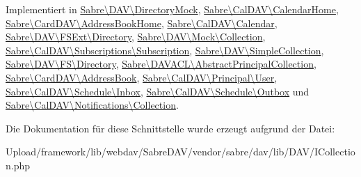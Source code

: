 Implementiert in \mbox{\hyperlink{class_sabre_1_1_d_a_v_1_1_directory_mock_a82552ec5014fe8fa6c33521bb5c17cef}{Sabre\textbackslash{}\+D\+A\+V\textbackslash{}\+Directory\+Mock}}, \mbox{\hyperlink{class_sabre_1_1_cal_d_a_v_1_1_calendar_home_aa97108e2047c34a8d17ee6bbac1f4e67}{Sabre\textbackslash{}\+Cal\+D\+A\+V\textbackslash{}\+Calendar\+Home}}, \mbox{\hyperlink{class_sabre_1_1_card_d_a_v_1_1_address_book_home_a6df725f024e566d1d94f5fc312c2c17d}{Sabre\textbackslash{}\+Card\+D\+A\+V\textbackslash{}\+Address\+Book\+Home}}, \mbox{\hyperlink{class_sabre_1_1_cal_d_a_v_1_1_calendar_a438e79532992b4da02ed17df296a9346}{Sabre\textbackslash{}\+Cal\+D\+A\+V\textbackslash{}\+Calendar}}, \mbox{\hyperlink{class_sabre_1_1_d_a_v_1_1_f_s_ext_1_1_directory_a1e4053591ca60a6abd189f88b6ed1bba}{Sabre\textbackslash{}\+D\+A\+V\textbackslash{}\+F\+S\+Ext\textbackslash{}\+Directory}}, \mbox{\hyperlink{class_sabre_1_1_d_a_v_1_1_mock_1_1_collection_a3814f1e53b147e13ebdddc6324639a80}{Sabre\textbackslash{}\+D\+A\+V\textbackslash{}\+Mock\textbackslash{}\+Collection}}, \mbox{\hyperlink{class_sabre_1_1_cal_d_a_v_1_1_subscriptions_1_1_subscription_a167dfe0d1f2dd478b1e3e80da4240d98}{Sabre\textbackslash{}\+Cal\+D\+A\+V\textbackslash{}\+Subscriptions\textbackslash{}\+Subscription}}, \mbox{\hyperlink{class_sabre_1_1_d_a_v_1_1_simple_collection_abd14f5c14daf0ab6cb480c9894b25f16}{Sabre\textbackslash{}\+D\+A\+V\textbackslash{}\+Simple\+Collection}}, \mbox{\hyperlink{class_sabre_1_1_d_a_v_1_1_f_s_1_1_directory_ab955171be88f9c130fd8d71f5d271aab}{Sabre\textbackslash{}\+D\+A\+V\textbackslash{}\+F\+S\textbackslash{}\+Directory}}, \mbox{\hyperlink{class_sabre_1_1_d_a_v_a_c_l_1_1_abstract_principal_collection_abf3123b838a191b0a60d2324ba3e95dc}{Sabre\textbackslash{}\+D\+A\+V\+A\+C\+L\textbackslash{}\+Abstract\+Principal\+Collection}}, \mbox{\hyperlink{class_sabre_1_1_card_d_a_v_1_1_address_book_a0ce5bf311d7c56481966ddf34d2b2563}{Sabre\textbackslash{}\+Card\+D\+A\+V\textbackslash{}\+Address\+Book}}, \mbox{\hyperlink{class_sabre_1_1_cal_d_a_v_1_1_principal_1_1_user_a98c22dc6958f352eadf92c960bd3bf19}{Sabre\textbackslash{}\+Cal\+D\+A\+V\textbackslash{}\+Principal\textbackslash{}\+User}}, \mbox{\hyperlink{class_sabre_1_1_cal_d_a_v_1_1_schedule_1_1_inbox_afd7af5894f052f0a2eb86455065fe495}{Sabre\textbackslash{}\+Cal\+D\+A\+V\textbackslash{}\+Schedule\textbackslash{}\+Inbox}}, \mbox{\hyperlink{class_sabre_1_1_cal_d_a_v_1_1_schedule_1_1_outbox_a08366beb598d4e73e772562cd342cba9}{Sabre\textbackslash{}\+Cal\+D\+A\+V\textbackslash{}\+Schedule\textbackslash{}\+Outbox}} und \mbox{\hyperlink{class_sabre_1_1_cal_d_a_v_1_1_notifications_1_1_collection_ad32780b546f2afcf90bd761741735831}{Sabre\textbackslash{}\+Cal\+D\+A\+V\textbackslash{}\+Notifications\textbackslash{}\+Collection}}.



Die Dokumentation für diese Schnittstelle wurde erzeugt aufgrund der Datei\+:\begin{DoxyCompactItemize}
\item 
Upload/framework/lib/webdav/\+Sabre\+D\+A\+V/vendor/sabre/dav/lib/\+D\+A\+V/I\+Collection.\+php\end{DoxyCompactItemize}
